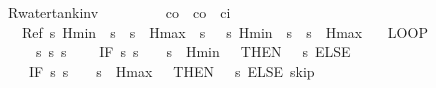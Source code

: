 \documentclass[envcountsame]{llncs}
\begin{document}
\begin{example}\label{ex:tank-rinv}
\begin{isabellebody}
\isanewline
{}\isamarkupfalse%
\ R{\isacharunderscore}water{\isacharunderscore}tank{\isacharunderscore}inv{\isacharcolon}\isanewline
\ \ \ {\isachardoublequoteopen}{}\ {\isasymle}\ {\isasymtau}{\isachardoublequoteclose}\ \ {\isachardoublequoteopen}{}\ {\isacharless}\ c\isactrlsub o{\isachardoublequoteclose}\ \ {\isachardoublequoteopen}c\isactrlsub o\ {\isacharless}\ c\isactrlsub i{\isachardoublequoteclose}\isanewline
\ \ \ {\isachardoublequoteopen}Ref\ {\isasymlceil}{\isasymlambda}s{\isachardot}\ Hmin\ {\isacharless}\ s{\isachardollar}{}\ {\isasymand}\ s{\isachardollar}{}\ {\isacharless}\ Hmax\ {\isasymand}\ s{\isachardollar}{}\ {\isacharequal}\ {}{\isasymrceil}\ {\isasymlceil}{\isasymlambda}s{\isachardot}\ Hmin\ {\isasymle}\ s{\isachardollar}{}\ {\isasymand}\ s{\isachardollar}{}\ {\isasymle}\ Hmax{\isasymrceil}\ {\isasymge}\isanewline
\ \ {\isacharparenleft}LOOP\ \isanewline
\ \ \ \ %
\isanewline
\ \ \ \ {\isacharparenleft}{\isacharparenleft}{}\ {\isacharcolon}{\isacharcolon}{\isacharequal}{\isacharparenleft}{\isasymlambda}s{\isachardot}{}{\isacharparenright}{\isacharparenright}{\isacharsemicolon}{\isacharparenleft}{}\ {\isacharcolon}{\isacharcolon}{\isacharequal}{\isacharparenleft}{\isasymlambda}s{\isachardot}\ s{\isachardollar}{}{\isacharparenright}{\isacharparenright}{\isacharsemicolon}\isanewline
\ \ \ \ {\isacharparenleft}IF\ {\isacharparenleft}{\isasymlambda}s{\isachardot}\ s{\isachardollar}{}\ {\isacharequal}\ {}\ {\isasymand}\ s{\isachardollar}{}\ {\isasymle}\ Hmin\ {\isacharplus}\ {}{\isacharparenright}\ THEN\ {\isacharparenleft}{}\ {\isacharcolon}{\isacharcolon}{\isacharequal}\ {\isacharparenleft}{\isasymlambda}s{\isachardot}{}{\isacharparenright}{\isacharparenright}\ ELSE\ \isanewline
\ \ \ \ {\isacharparenleft}IF\ {\isacharparenleft}{\isasymlambda}s{\isachardot}\ s{\isachardollar}{}\ {\isacharequal}\ {}\ {\isasymand}\ s{\isachardollar}{}\ {\isasymge}\ Hmax\ {\isacharminus}\ {}{\isacharparenright}\ THEN\ {\isacharparenleft}{}\ {\isacharcolon}{\isacharcolon}{\isacharequal}\ {\isacharparenleft}{\isasymlambda}s{\isachardot}{}{\isacharparenright}{\isacharparenright}\ ELSE\ skip{\isacharparenright}{\isacharparenright}{\isacharsemicolon}\isanewline

\end{isabellebody}
\end{example}
\end{document}
